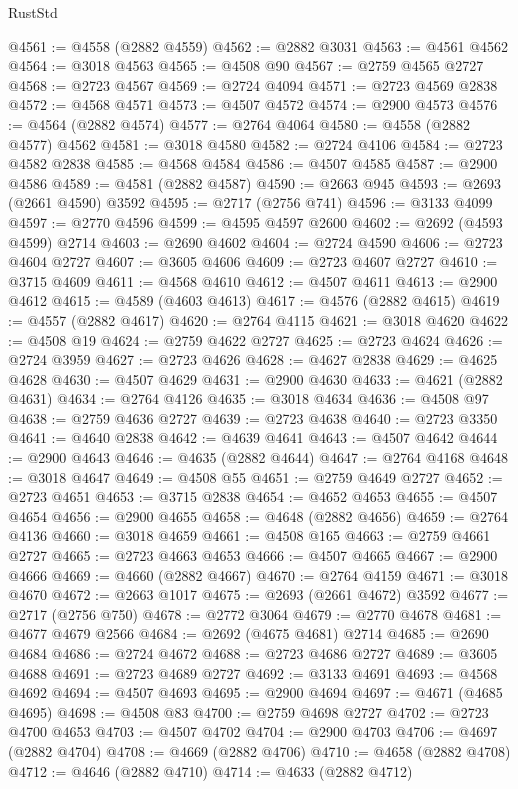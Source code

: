 \begin{lexlean}{RustStd}
\begin{coremodule}
{\begin{coremodule}
{{{{{{{{{{{{{{{{{{{{{{{{{{{{{{{{{{{{{{{@4561 := @4558 (@2882 @4559)
@4562 := @2882 @3031
@4563 := @4561 @4562
@4564 := @3018 @4563
@4565 := @4508 @90
@4567 := @2759 @4565 @2727
@4568 := @2723 @4567
@4569 := @2724 @4094
@4571 := @2723 @4569 @2838
@4572 := @4568 @4571
@4573 := @4507 @4572
@4574 := @2900 @4573
@4576 := @4564 (@2882 @4574)
@4577 := @2764 @4064
@4580 := @4558 (@2882 @4577) @4562
@4581 := @3018 @4580
@4582 := @2724 @4106
@4584 := @2723 @4582 @2838
@4585 := @4568 @4584
@4586 := @4507 @4585
@4587 := @2900 @4586
@4589 := @4581 (@2882 @4587)
@4590 := @2663 @945
@4593 := @2693 (@2661 @4590) @3592
@4595 := @2717 (@2756 @741)
@4596 := @3133 @4099
@4597 := @2770 @4596
@4599 := @4595 @4597 @2600
@4602 := @2692 (@4593 @4599) @2714
@4603 := @2690 @4602
@4604 := @2724 @4590
@4606 := @2723 @4604 @2727
@4607 := @3605 @4606
@4609 := @2723 @4607 @2727
@4610 := @3715 @4609
@4611 := @4568 @4610
@4612 := @4507 @4611
@4613 := @2900 @4612
@4615 := @4589 (@4603 @4613)
@4617 := @4576 (@2882 @4615)
@4619 := @4557 (@2882 @4617)
@4620 := @2764 @4115
@4621 := @3018 @4620
@4622 := @4508 @19
@4624 := @2759 @4622 @2727
@4625 := @2723 @4624
@4626 := @2724 @3959
@4627 := @2723 @4626
@4628 := @4627 @2838
@4629 := @4625 @4628
@4630 := @4507 @4629
@4631 := @2900 @4630
@4633 := @4621 (@2882 @4631)
@4634 := @2764 @4126
@4635 := @3018 @4634
@4636 := @4508 @97
@4638 := @2759 @4636 @2727
@4639 := @2723 @4638
@4640 := @2723 @3350
@4641 := @4640 @2838
@4642 := @4639 @4641
@4643 := @4507 @4642
@4644 := @2900 @4643
@4646 := @4635 (@2882 @4644)
@4647 := @2764 @4168
@4648 := @3018 @4647
@4649 := @4508 @55
@4651 := @2759 @4649 @2727
@4652 := @2723 @4651
@4653 := @3715 @2838
@4654 := @4652 @4653
@4655 := @4507 @4654
@4656 := @2900 @4655
@4658 := @4648 (@2882 @4656)
@4659 := @2764 @4136
@4660 := @3018 @4659
@4661 := @4508 @165
@4663 := @2759 @4661 @2727
@4665 := @2723 @4663 @4653
@4666 := @4507 @4665
@4667 := @2900 @4666
@4669 := @4660 (@2882 @4667)
@4670 := @2764 @4159
@4671 := @3018 @4670
@4672 := @2663 @1017
@4675 := @2693 (@2661 @4672) @3592
@4677 := @2717 (@2756 @750)
@4678 := @2772 @3064
@4679 := @2770 @4678
@4681 := @4677 @4679 @2566
@4684 := @2692 (@4675 @4681) @2714
@4685 := @2690 @4684
@4686 := @2724 @4672
@4688 := @2723 @4686 @2727
@4689 := @3605 @4688
@4691 := @2723 @4689 @2727
@4692 := @3133 @4691
@4693 := @4568 @4692
@4694 := @4507 @4693
@4695 := @2900 @4694
@4697 := @4671 (@4685 @4695)
@4698 := @4508 @83
@4700 := @2759 @4698 @2727
@4702 := @2723 @4700 @4653
@4703 := @4507 @4702
@4704 := @2900 @4703
@4706 := @4697 (@2882 @4704)
@4708 := @4669 (@2882 @4706)
@4710 := @4658 (@2882 @4708)
@4712 := @4646 (@2882 @4710)
@4714 := @4633 (@2882 @4712)
}}}}}}}}}}}}}}}}}}}}}}}}}}}}}}}}}}}}}}}
\end{coremodule}}
\end{coremodule}
\end{lexlean}
